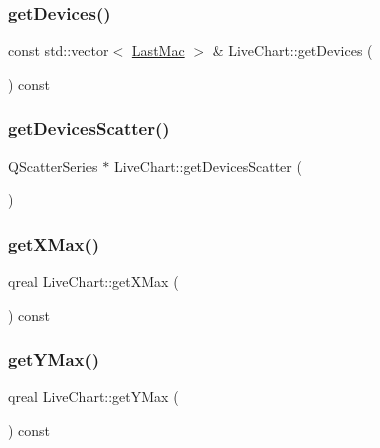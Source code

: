 \subsubsection{\texorpdfstring{get\+Devices()}{getDevices()}}
{\footnotesize\ttfamily const std\+::vector$<$ \hyperlink{class_last_mac}{Last\+Mac} $>$ \& Live\+Chart\+::get\+Devices (\begin{DoxyParamCaption}{ }\end{DoxyParamCaption}) const}

\mbox{\label{class_live_chart_a8cc7eeca378b44c8c3e0c5f747c4f371}} 
\subsubsection{\texorpdfstring{get\+Devices\+Scatter()}{getDevicesScatter()}}
{\footnotesize\ttfamily Q\+Scatter\+Series $\ast$ Live\+Chart\+::get\+Devices\+Scatter (\begin{DoxyParamCaption}{ }\end{DoxyParamCaption})}

\mbox{\label{class_live_chart_a98a181f02aab9a8520c827918c10b17b}} 
\subsubsection{\texorpdfstring{get\+X\+Max()}{getXMax()}}
{\footnotesize\ttfamily qreal Live\+Chart\+::get\+X\+Max (\begin{DoxyParamCaption}{ }\end{DoxyParamCaption}) const}

\mbox{\label{class_live_chart_a07e50443776326949c789a76b66f6710}} 
\subsubsection{\texorpdfstring{get\+Y\+Max()}{getYMax()}}
{\footnotesize\ttfamily qreal Live\+Chart\+::get\+Y\+Max (\begin{DoxyParamCaption}{ }\end{DoxyParamCaption}) const}

